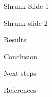 \documentclass[english]{beamer}\usepackage[]{graphicx}\usepackage[]{xcolor}
\begin{document}
\begin{frame}[shrink = 5]{Shrunk Slide 1}


\end{frame}



\begin{frame}[shrink = 23]{Shrunk slide 2}


\end{frame}



\begin{frame}{Results}


\end{frame}

\begin{frame}{Conclusion}


\end{frame}


\begin{frame}{Next steps}


\end{frame}

\begin{frame}{References}
  \small
  

\end{frame}


\end{document}
